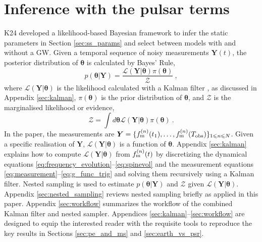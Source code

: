 \documentclass[fleqn,usenatbib,useAMS]{mnras}
\begin{document}
\section{Inference with the pulsar terms}\label{sec:pulsar_term}
K24 developed a likelihood-based Bayesian framework to infer the static parameters in Section \ref{sec:ss_params} and select between models with and without a GW. Given a temporal sequence of noisy measurements $\boldsymbol{Y}(t)$, the posterior distribution of $\boldsymbol{\theta}$ is calculated by Bayes' Rule,
\begin{equation}
	p(\boldsymbol{\theta} | \boldsymbol{Y}) = \frac{\mathcal{L}(\boldsymbol{Y} | \boldsymbol{\theta}) \pi(\boldsymbol{\theta})}{\mathcal{Z}} \ ,
\end{equation}
where $\mathcal{L}(\boldsymbol{Y}| \boldsymbol{\theta})$ is the likelihood calculated with a Kalman filter \citep{Kalman1}, as discussed in Appendix \ref{sec:kalman}, $\pi(\boldsymbol{\theta})$ is the prior distribution of $\boldsymbol{\theta}$, and $\mathcal{Z}$ is the marginalised likelihood or evidence,
\begin{equation}
	\mathcal{Z} = \int d \boldsymbol{\theta} \mathcal{L}(\boldsymbol{Y} | \boldsymbol{\theta})  \pi(\boldsymbol{\theta})  \ . \label{eq:model_evidence}
\end{equation}
In the paper, the measurements are ${\boldsymbol{Y}} = \{ f^{(n)}_{\rm m}(t_1), \dots, f^{(n)}_{\rm m}(T_{\rm obs})  \}_{1 \leq n \leq N}$. Given a specific realisation of $\boldsymbol{Y}$, $\mathcal{L}(\boldsymbol{Y}| \boldsymbol{\theta})$ is a function of $\boldsymbol{\theta}$. Appendix \ref{sec:kalman} explains how to compute ${\mathcal{L}}({\boldsymbol{Y}}|{\boldsymbol{\theta}})$ from $f_{\rm m}^{(n)}(t)$ by discretizing the dynamical equations \eqref{eq:frequency_evolution}--\eqref{eq:spinevol} and the measurement equations \eqref{eq:measurement}--\eqref{eq:g_func_trig} and solving them recursively using a Kalman filter. Nested sampling \citep{Skilling} is used to estimate $p(\boldsymbol{\theta} | \boldsymbol{Y})$ and $\mathcal{Z}$ given ${\mathcal{L}}({\boldsymbol{Y}}|{\boldsymbol{\theta}})$. Appendix \ref{sec:nested_sampling} reviews nested sampling briefly as applied in this paper. Appendix \ref{sec:workflow} summarizes the workflow of the combined Kalman filter and nested sampler. Appendices \ref{sec:kalman}--\ref{sec:workflow} are designed to equip the interested reader with the requisite tools to reproduce the key results in Sections \ref{sec:pe_and_ms} and \ref{sec:earth_vs_psr}. \newline 
 
\end{document}

